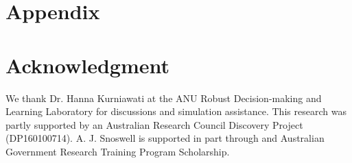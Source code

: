 \documentclass[letterpaper, 10 pt, conference]{ieeeconf}
\begin{document}






\section*{Appendix}

\section*{Acknowledgment}

We thank Dr. Hanna Kurniawati at the ANU Robust Decision-making and Learning Laboratory for discussions and simulation assistance.  This research was partly supported by an Australian Research Council Discovery Project (DP160100714).  A. J. Snoswell is supported in part through and Australian Government Research Training Program Scholarship. 





\end{document}
